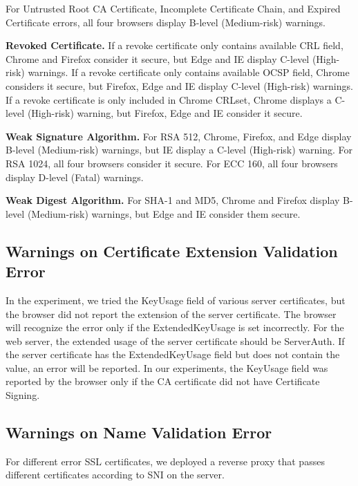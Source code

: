     For Untrusted Root CA Certificate, Incomplete Certificate Chain, and Expired Certificate errors,
        all four browsers display B-level (Medium-risk) warnings.

\textbf{Revoked Certificate.}
    If a revoke certificate only contains available CRL field,
        Chrome and Firefox consider it secure,
            but Edge and IE display C-level (High-risk) warnings.
    If a revoke certificate only contains available OCSP field,
        Chrome considers it secure, but Firefox,
            Edge and IE display C-level (High-risk) warnings.
    If a revoke certificate is only included in Chrome CRLset,
        Chrome displays a C-level (High-risk) warning,
            but Firefox, Edge and IE consider it secure.

\textbf{Weak Signature Algorithm.}
    For RSA 512,
        Chrome, Firefox, and Edge display B-level (Medium-risk) warnings,
            but IE display a C-level (High-risk) warning.
    For RSA 1024,
        all four browsers consider it secure.
    For ECC 160,
        all four browsers display D-level (Fatal) warnings.

\textbf{Weak Digest Algorithm.}
    For SHA-1 and MD5,
        Chrome and Firefox display B-level (Medium-risk) warnings,
            but Edge and IE consider them secure.

\subsection{Warnings on Certificate Extension Validation Error}

In the experiment, we tried the KeyUsage field of various server certificates, but the browser did not report the extension of the server certificate. The browser will recognize the error only if the ExtendedKeyUsage is set incorrectly. For the web server, the extended usage of the server certificate should be ServerAuth. If the server certificate has the ExtendedKeyUsage field but does not contain the value, an error will be reported. In our experiments, the KeyUsage field was reported by the browser only if the CA certificate did not have Certificate Signing.
\subsection{Warnings on Name Validation Error}
For different error SSL certificates, we deployed a reverse proxy that passes different certificates according to SNI on the server.

